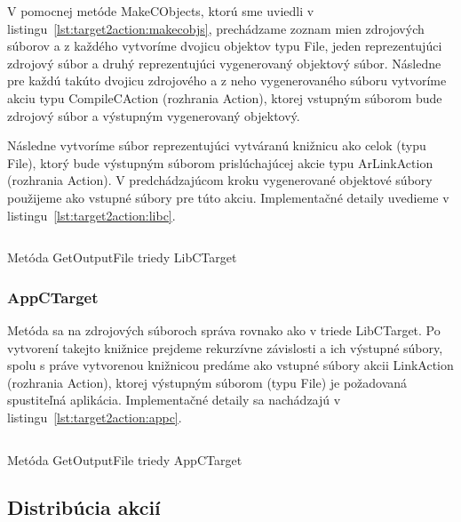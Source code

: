 V pomocnej metóde MakeCObjects, ktorú sme uviedli v listingu~\ref{lst:target2action:makecobjs},
prechádzame zoznam mien zdrojových súborov a z každého vytvoríme dvojicu objektov
typu File, jeden reprezentujúci zdrojový súbor a druhý reprezentujúci vygenerovaný
objektový súbor. Následne pre každú takúto dvojicu zdrojového a z neho vygenerovaného
súboru vytvoríme akciu typu CompileCAction (rozhrania Action), ktorej vstupným
súborom bude zdrojový súbor a výstupným vygenerovaný objektový.

Následne vytvoríme súbor reprezentujúci vytváranú knižnicu ako celok (typu File),
ktorý bude výstupným súborom prislúchajúcej akcie typu ArLinkAction (rozhrania Action).
V predchádzajúcom kroku vygenerované objektové súbory použijeme ako vstupné
súbory pre túto akciu. Implementačné detaily uvedieme v listingu~\ref{lst:target2action:libc}.

\begin{listing}[H]
  \inputminted[frame=lines,framesep=2mm,linenos,fontsize=\scriptsize,firstline=48,lastline=74]{go}{/home/pepol/src/imterra/forge/client/target/target.go}
  \caption{Metóda GetOutputFile triedy LibCTarget}
  \label{lst:target2action:libc}
\end{listing}

\subsubsection{AppCTarget}
Metóda sa na zdrojových súboroch správa rovnako ako v triede LibCTarget. Po
vytvorení takejto knižnice prejdeme rekurzívne závislosti a ich výstupné
súbory, spolu s práve vytvorenou knižnicou predáme ako vstupné súbory
akcii LinkAction (rozhrania Action), ktorej výstupným súborom (typu File)
je požadovaná spustiteľná aplikácia. Implementačné detaily sa nachádzajú v
listingu~\ref{lst:target2action:appc}.

\begin{listing}[H]
  \inputminted[frame=lines,framesep=2mm,linenos,fontsize=\scriptsize,firstline=92,lastline=131]{go}{/home/pepol/src/imterra/forge/client/target/target.go}
  \caption{Metóda GetOutputFile triedy AppCTarget}
  \label{lst:target2action:appc}
\end{listing}

\subsection{Distrib\'{u}cia akci\'{i}}
\label{sec:master:distribution}

